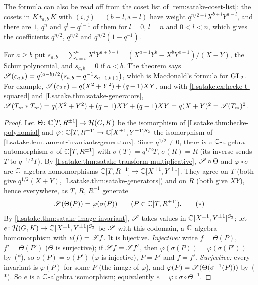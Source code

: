 \noindent The formula can also be read off from the coset list of \cref{rem:satake-coset-list}: the cosets in
$K\,t_{a,b}\,K$ with $(i,j)=(b+l,a-l)$ have weight $q^{n/2-l}X^{b+l}Y^{a-l}$, and there are $1$, $q^n$ and $q^l-q^{l-1}$
of them for $l=0$, $l=n$ and $0<l<n$, which gives the coefficients $q^{n/2}$, $q^{n/2}$ and $q^{n/2}(1-q^{-1})$.

\begin{remark}\label{rem:satake-macdonald}
For $a\ge b$ put $s_{a,b}=\sum_{i=b}^aX^iY^{a+b-i}=(X^{a+1}Y^b-X^bY^{a+1})/(X-Y)$, the Schur polynomial, and
$s_{a,b}=0$ if $a<b$. The theorem says $\mathscr{S}(c_{a,b})=q^{(a-b)/2}\bigl(s_{a,b}-q^{-1}s_{a-1,b+1}\bigr)$, which is
Macdonald's formula for $\mathrm{GL}_2$. For example, $\mathscr{S}(c_{2,0})=q(X^2+Y^2)+(q-1)XY$, and with
\cref{I.satake.ex:hecke-t-squared} and \cref{I.satake.thm:satake-generators},
$\mathscr{S}(T_\varpi*T_\varpi)=q(X^2+Y^2)+(q-1)XY+(q+1)XY=q(X+Y)^2=\mathscr{S}(T_\varpi)^2$.
\end{remark}

\begin{theorem}
\end{theorem}
\begin{proof}
Let $\Theta\colon\mathbb{C}[T,R^{\pm1}]\to\mathcal H(G,K)$ be the isomorphism of \cref{I.satake.thm:hecke-polynomial} and
$\varphi\colon\mathbb{C}[T,R^{\pm1}]\to\mathbb{C}[X^{\pm1},Y^{\pm1}]^{S_2}$ the isomorphism of
\cref{I.satake.lem:laurent-invariants-generators}. Since $q^{1/2}\neq0$, there is a $\mathbb{C}$-algebra automorphism $\sigma$ of
$\mathbb{C}[T,R^{\pm1}]$ with $\sigma(T)=q^{1/2}T$, $\sigma(R)=R$ (its inverse sends $T$ to $q^{-1/2}T$). By
\cref{I.satake.thm:satake-transform-multiplicative}, $\mathscr{S}\circ\Theta$ and $\varphi\circ\sigma$ are $\mathbb{C}$-algebra
homomorphisms $\mathbb{C}[T,R^{\pm1}]\to\mathbb{C}[X^{\pm1},Y^{\pm1}]$. They agree on $T$ (both give $q^{1/2}(X+Y)$,
\cref{I.satake.thm:satake-generators}) and on $R$ (both give $XY$), hence everywhere, as $T$, $R$, $R^{-1}$ generate:
\[
  \mathscr{S}(\Theta(P))=\varphi(\sigma(P))\qquad(P\in\mathbb{C}[T,R^{\pm1}]).\tag{$*$}
\]
By \cref{I.satake.thm:satake-image-invariant}, $\mathscr{S}$ takes values in $\mathbb{C}[X^{\pm1},Y^{\pm1}]^{S_2}$; let
$e\colon\mathcal H(G,K)\to\mathbb{C}[X^{\pm1},Y^{\pm1}]^{S_2}$ be $\mathscr{S}$ with this codomain, a $\mathbb{C}$-algebra homomorphism with
$e(f)=\mathscr{S} f$. It is bijective. \emph{Injective:} write $f=\Theta(P)$, $f'=\Theta(P')$ ($\Theta$ is surjective); if
$\mathscr{S} f=\mathscr{S} f'$, then $\varphi(\sigma(P))=\varphi(\sigma(P'))$ by~($*$), so $\sigma(P)=\sigma(P')$ ($\varphi$ is
injective), $P=P'$ and $f=f'$. \emph{Surjective:} every invariant is $\varphi(P)$ for some $P$ (the image of $\varphi$),
and $\varphi(P)=\mathscr{S}(\Theta(\sigma^{-1}(P)))$ by~($*$). So $e$ is a $\mathbb{C}$-algebra isomorphism; equivalently
$e=\varphi\circ\sigma\circ\Theta^{-1}$.
\end{proof}

